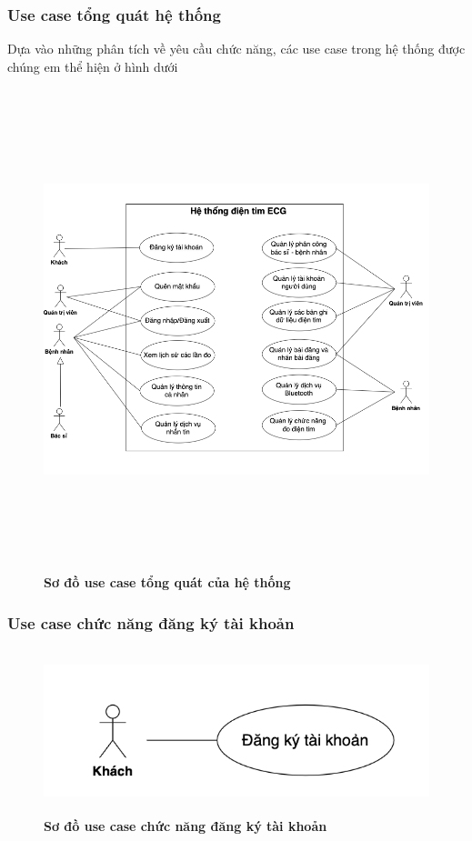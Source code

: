 \subsubsection{Use case tổng quát hệ thống}
Dựa vào những phân tích về yêu cầu chức năng, các use case trong hệ thống được chúng em thể hiện ở hình dưới 
  \begin{figure}[H]
    \centering
    \includegraphics[width=16cm,height=14cm]{Images/use_case/use_case_general.png}
    \caption[Sơ đồ use case tổng quát của hệ thống]{\bfseries \fontsize{12pt}{0pt}
    \selectfont Sơ đồ use case tổng quát của hệ thống}
    \label{use_case_general} %
  \end{figure}

\subsubsection{Use case chức năng đăng ký tài khoản}
  \begin{figure}[H]
    \centering
    \includegraphics[width=12cm,height=4.8cm]{Images/use_case/use_case_register.png}
    \caption[Sơ đồ use case chức năng đăng ký tài khoản]{\bfseries \fontsize{12pt}{0pt}
    \selectfont Sơ đồ use case chức năng đăng ký tài khoản}
    \label{use_case_register} %
  \end{figure}

